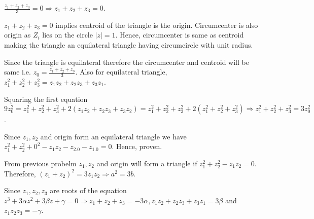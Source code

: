   $\frac{z_1 + z_2 + z_3}{3} = 0 \Rightarrow z_1 + z_2 + z_3 = 0$.
\item $z_1 + z_2 + z_3 = 0$ implies centroid of the triangle is the origin. Circumcenter is also origin as
  $Z_i$ lies on the circle $|z| = 1$. Hence, circumcenter is same as centroid making the triangle an
  equilateral triangle having circumcircle with unit radius.
\item Since the triangle is equilateral therefore the circumcenter and centroid will be same i.e. $z_0 =
  \frac{z_1 + z_2 + z_3}{3}$. Also for equilateral triangle, $z_1^2 + z_2^2 + z_3^2 = z_1z_2 + z_2z_3 +
  z_3z_1$.

  Squaring the first equation $9z_0^2 = z_1^2 + z_2^2 + z_3^2 + 2(z_1z_2 + z_2z_3 + z_3z_2) = z_1^2 + z_2^2
  + z_3^2 + 2(z_1^2 + z_2^2 + z_3^2) \Rightarrow z_1^2 + z_2^2 + z_3^2 = 3z_0^2$.
\item Since $z_1, z_2$ and origin form an equilateral triangle we have
  $z_1^2 + z_2^2 + 0^2 - z_1z_2 - z_2.0 - z_1.0 = 0$. Hence, proven.
\item From previous probelm $z_1, z_2$ and origin will form a triangle if $z_1^2 + z_2^2 - z_1z_2 = 0.$
  Therefore,  $(z_1 + z_2)^2 = 3z_1z_2 \Rightarrow a^2 = 3b$.
\item Since $z_1, z_2, z_3$ are roots of the equation $z^3 + 3\alpha z^2 + 3\beta z + \gamma = 0\Rightarrow
  z_1 + z_2 + z_3 = -3\alpha, z_1z_2 + z_2z_3 + z_3z_1 = 3\beta$ and $z_1z_2z_3 = -\gamma$.

